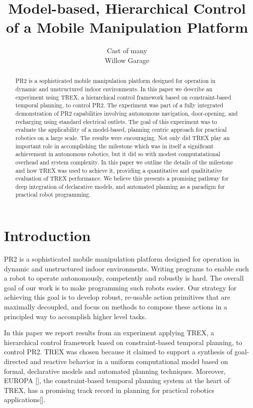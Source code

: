 \documentclass[letterpaper]{article}
\begin{document}
%
\title{Model-based, Hierarchical Control of a Mobile Manipulation Platform}
\author{Cast of many\\
Willow Garage
}
\maketitle
\begin{abstract}
PR2 is a sophisticated mobile manipulation platform designed for operation in dynamic and unstructured indoor environments. In this paper we describe an experiment using TREX, a hierarchical control framework based on constraint-based temporal planning, to control PR2. The experiment was part of a fully integrated demonstration of PR2 capabilities involving autonomous navigation, door-opening, and recharging using standard electrical outlets. The goal of this experiment was to evaluate the applicability of a model-based, planning centric approach for practical robotics on a large scale. The results were encouraging. Not only did TREX play an important role in accomplishing the milestone which was in itself  a significant achievement in autonomous robotics, but it did so with modest computatational overhead and system complexity. In this paper we outline the details of the milestone and how TREX was used to achieve it, providing a quantitative and qualititative evaluation of TREX performance. We believe this presents a promising pathway for deep integration of declarative models, and automated planning as a paradigm for practical robot programming.
\begin{quote}
\end{quote}
\end{abstract}

\section{Introduction}
PR2 is a sophisticated mobile manipulation platform designed for operation in dynamic and unstructured indoor environments. Writing programs to enable such a robot to operate autonomously, competently and robustly is hard. The overall goal of our work is to make programming such robots easier. Our strategy for achieving this goal is to develop robust, re-usable action primitives that are maximally decoupled, and focus on methods to compose these actions in a principled way to accomplish higher level tasks. 

In this paper we report results from an experiment applying TREX, a hierarchical control framework based on constraint-based temporal planning, to control PR2. TREX was chosen because it claimed to support a synthesis of goal-directed and reactive behavior in a uniform computational model based on formal, declarative models and automated planning techniques. Moreover, EUROPA [], the constraint-based temporal planning system at the heart of TREX, has a promising track record in planning for practical robotics applications[]. 
\end{document}
